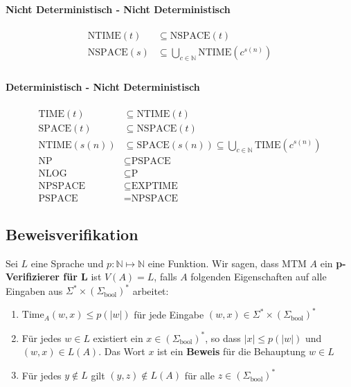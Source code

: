 \documentclass[11pt]{article}
\newcommand{\ttc}{\text{Time}}
\begin{document}
\paragraph{Nicht Deterministisch - Nicht Deterministisch}
\begin{equation*}
\begin{split}
	\text{NTIME}(t) & \subseteq \text{NSPACE}(t)\\
	\text{NSPACE}(s) & \subseteq \bigcup_{c \in \mathbb{N}}\text{NTIME}(c^{s(n)}) \\
\end{split}
\end{equation*}

\paragraph{Deterministisch - Nicht Deterministisch}
\begin{equation*}
\begin{split}
	\text{TIME}(t) & \subseteq \text{NTIME}(t) \\
	\text{SPACE}(t) & \subseteq \text{NSPACE}(t) \\
	\text{NTIME}(s(n)) & \subseteq \text{SPACE}(s(n)) \subseteq \bigcup_{c \in \mathbb{N}}\text{TIME}(c^{s(n)}) \\
	\text{NP} & \subseteq \text{PSPACE} \\
	\text{NLOG} & \subseteq \text{P} \\
	\text{NPSPACE} & \subseteq \text{EXPTIME} \\
	\text{PSPACE} & = \text{NPSPACE}
\end{split}
\end{equation*}

\subsection{Beweisverifikation}

Sei $L$ eine Sprache und $p: \mathbb{N} \mapsto \mathbb{N}$ eine Funktion. Wir sagen, dass MTM $A$ ein \textbf{p-Verifizierer f{\"u}r L} ist $V(A) = L$, falls $A$ folgenden Eigenschaften auf alle Eingaben aus $\Sigma^* \times (\Sigma_\text{bool})^*$ arbeitet:

\begin{enumerate}[label=(\roman*), noitemsep]
	\item $\ttc_A(w,x) \leq p(|w|)$ f{\"u}r jede Eingabe $(w,x) \in \Sigma^* \times (\Sigma_\text{bool})^*$
	\item F{\"u}r jedes $w \in L$ existiert ein $x \in (\Sigma_\text{bool})^*$, so dass $|x| \leq p(|w|)$ und $(w,x) \in L(A)$. Das Wort $x$ ist ein \textbf{Beweis} f{\"u}r die Behauptung $w \in L$
	\item F{\"u}r jedes $y \not\in L$ gilt $(y, z) \not\in L(A)$ f{\"u}r alle $z \in (\Sigma_\text{bool})^*$
\end{enumerate}
\end{document}
